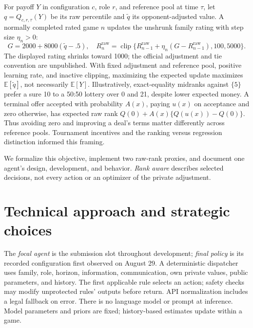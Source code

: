 \documentclass{article}
\newcommand{\E}{\mathbb{E}}
\begin{document}
For payoff $Y$ in configuration $c$, role $r$, and reference pool at time
$\tau$, let $q=Q_{c,r,\tau}(Y)$ be its raw percentile and $\widetilde q$ its
opponent-adjusted value. A normally completed rated game $n$ updates the
unshrunk family rating with step size $\eta_n>0$:
\begin{equation}
G=2000+8000(\widetilde q-.5),\quad
R_n^{\mathrm{raw}}=\operatorname{clip}\{R_{n-1}^{\mathrm{raw}}
+\eta_n(G-R_{n-1}^{\mathrm{raw}}),100,5000\}.
\label{eq:rating}
\end{equation}
The displayed rating shrinks toward 1000; the official adjustment and tie
convention are unpublished. With fixed adjustment and reference pool,
positive learning rate, and inactive clipping, maximizing the expected update
maximizes $\E[\widetilde q]$, not necessarily $\E[Y]$.
Illustratively, exact-equality midranks against $\{5\}$ prefer a sure 10
to a 50:50 lottery over 0 and 21, despite lower expected money. A terminal
offer accepted with probability $A(x)$, paying $u(x)$ on acceptance and zero
otherwise, has expected raw rank $Q(0)+A(x)\{Q(u(x))-Q(0)\}$. Thus avoiding zero
and improving a deal's terms matter differently across reference pools.
Tournament incentives and the ranking versus regression distinction
\citep{lazear1981tournaments,clemencon2008ranking} informed this framing.

We formalize this objective, implement two raw-rank proxies, and document one
agent's design, development, and behavior. \emph{Rank aware} describes selected
decisions, not every action or an optimizer of the private adjustment.

\section{Technical approach and strategic choices}
\label{sec:strategy}

The \emph{focal agent} is the submission slot throughout development;
\emph{final policy} is its recorded configuration first observed on August 29.
A deterministic dispatcher uses family, role, horizon, information,
communication, own private values, public parameters, and history. The first
applicable rule selects an action; safety checks may modify unprotected rules'
outputs before return. API normalization includes a legal fallback on error.
There is no language model or prompt at inference. Model parameters and priors
are fixed; history-based estimates update within a game.
\end{document}
